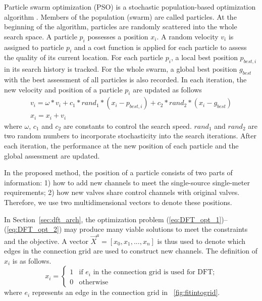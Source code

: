 Particle swarm optimization (PSO) is a stochastic population-based
optimization algorithm \cite{pso95}. Members of the population (swarm) are
called particles.  At the beginning of the algorithm, particles are randomly
scattered into the whole search space. A particle $p_i$ possesses a position
$x_i$. A random velocity $v_i$ is assigned to particle $p_i$ and a cost
function is applied for each particle to assess the quality of its current
location.  For each particle $p_i$, a local best position $p_{best,i}$ in its
search history is tracked. For the whole swarm, a global best position
$g_{best}$ with the best assessment of all particles is also recorded.  In
each iteration, the new velocity and position of a particle $p_i$ are updated
as follows
\begin{align}\label{eq:pso_update}
v_i = \omega * v_i + c_1*rand_1*(x_i - p_{best,i})+c_2*rand_2*(x_i-g_{best}) \\
x_i = x_i + v_i 
\end{align}
where $\omega$, $c_1$ and $c_2$ are constants to control the search speed.
$rand_1$ and $rand_2$ are two random numbers to incorporate
stochasticity into the search iterations.
After each iteration, the performance at the new position of each particle
and the global assessment are updated.


In the proposed method, the
position of a particle consists of two parts of information: 1) how to add new channels
to meet the single-source single-meter requirements; 2)
how new valves share control channels with original valves. 
Therefore, we use two multidimensional vectors to denote these positions.

In Section~\ref{sec:dft_arch}, the optimization problem
(\ref{eq:DFT_opt_1})--(\ref{eq:DFT_opt_2}) may produce  many viable solutions
to meet the constraints and the objective.
A vector $\vec{X}^{a}= [x_0,x_1,...,x_n]$ is thus used to denote which edges
in the connection grid are used to construct new channels.  The definition of
$x_i$ is as follows.
\begin{equation}
  x_i =
  \begin{cases}
    1 & \text{if $e_i$ in the connection grid 
      is used for DFT;}\\
    0 & \text{otherwise}
  \end{cases}
\end{equation}
where $e_i$ represents an edge in the connection grid in \figname~\ref{fig:fitintogrid}.


